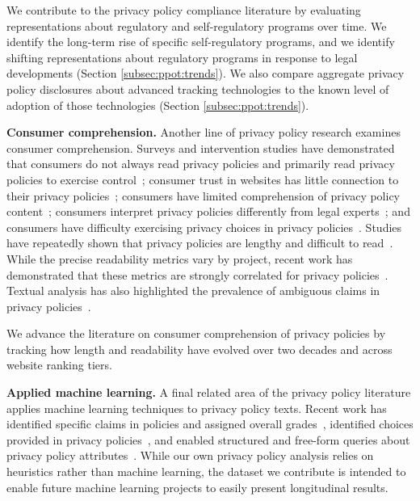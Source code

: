 We contribute to the privacy policy compliance literature by evaluating representations about regulatory and self-regulatory programs over time. We identify the long-term rise of specific self-regulatory programs,
 and we identify shifting representations about regulatory programs in response to legal developments
(Section \ref{subsec:ppot:trends}). We also compare aggregate privacy policy disclosures about advanced tracking technologies to the known level of adoption of those technologies (Section \ref{subsec:ppot:trends}).

\textbf{Consumer comprehension.}
Another line of privacy policy research examines consumer comprehension. Surveys and intervention studies have demonstrated that consumers do not always read privacy policies and primarily read privacy policies to exercise control~\cite{milne2004}; consumer trust in websites has little connection to their privacy policies~\cite{pan2006}; consumers have limited comprehension of privacy policy content~\cite{vail2008, mcdonald2009comparative}; consumers interpret privacy policies differently from legal experts~\cite{reidenberg2016disagreeable, strahilevitz2016}; and consumers have difficulty exercising privacy choices in privacy policies~\cite{habib2020}. Studies have repeatedly shown that privacy policies are lengthy and difficult to read~\cite{jensen2004, mcdonald2008cost, li2012online, fabian2017large}. While the precise readability metrics vary by project, recent work has demonstrated that these metrics are strongly correlated for privacy policies~\cite{fabian2017large}. Textual analysis has also highlighted the prevalence of ambiguous claims in privacy policies~\cite{reidenberg2016ambiguity}.

We advance the literature on consumer comprehension of privacy policies by tracking how length and readability have evolved over two decades and across website ranking tiers.

\textbf{Applied machine learning.}
A final related area of the privacy policy literature applies machine learning techniques to 
privacy policy texts. Recent work has identified specific claims in policies and assigned overall grades~\cite{zimmeck2014}, identified choices provided in privacy policies~\cite{sathyendra2017, kumar2020}, and enabled structured and free-form queries about privacy policy attributes~\cite{harkous2018polisis}. While our own privacy policy analysis relies on heuristics rather than  machine learning, the dataset we contribute is intended to enable future machine learning projects to easily present longitudinal results.